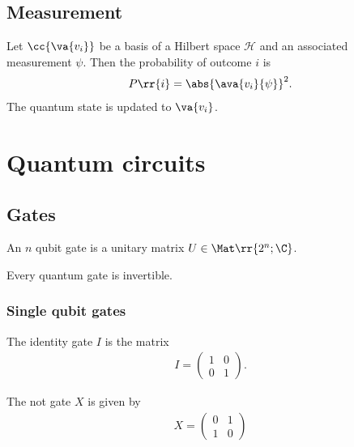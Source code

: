 \documentclass{article}
\begin{document}
\subsection{Measurement}
\label{sec:measurement}

\begin{definition}
  \label{def:probability-of-outcome}
  Let $\cc{\va{v_i}}$ be a basis of a Hilbert space $\mathcal{H}$ and an associated measurement $\psi$.
  Then the probability of outcome $i$ is
  \begin{align*}
    P\rr{i} = \abs{\ava{v_i}{\psi}}^2.
  \end{align*}
  The quantum state is updated to $\va{v_i}$.
\end{definition}

\section{Quantum circuits}
\label{sec:circuits}

\subsection{Gates}
\label{sec:gates}

\begin{definition}
  \label{def:single-qubit-gates}
  An $n$ qubit gate is a unitary matrix $U\in\Mat\rr{2^n;\C}$.
\end{definition}

\begin{corollary}
  Every quantum gate is invertible.
\end{corollary}

\subsubsection{Single qubit gates}
\label{sec:single-qubit-gates}

\begin{definition}
  \label{def:identity}
  The identity gate $I$ is the matrix
  \begin{align*}
    I = \begin{pmatrix}
      1 & 0 \\ 0 & 1
    \end{pmatrix}.
  \end{align*}
\end{definition}

\begin{definition}
  \label{def:not}
  The not gate $X$ is given by
  \begin{align*}
    X = \begin{pmatrix}
      0 & 1 \\ 1 & 0
    \end{pmatrix}
  \end{align*}
\end{definition}
\end{document}
